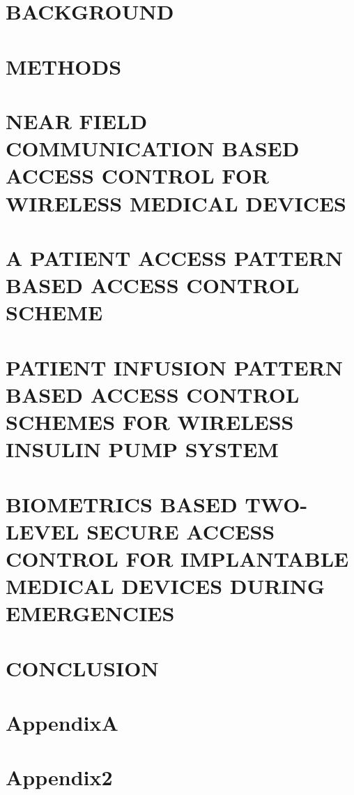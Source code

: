 \documentclass[reqno,12pt,oneside]{report} %
\begin{document}
\chapter{BACKGROUND}
 \label{chap:2}
 

\chapter{METHODS}
 \label{chap:3}
 

\chapter{NEAR FIELD COMMUNICATION BASED ACCESS CONTROL FOR WIRELESS MEDICAL DEVICES}
 \label{chap:4}
 

\chapter{A PATIENT ACCESS PATTERN BASED ACCESS CONTROL SCHEME}
 \label{chap:5}
 

\chapter{PATIENT INFUSION PATTERN BASED ACCESS CONTROL SCHEMES FOR WIRELESS INSULIN PUMP SYSTEM}
 \label{chap:6}
 

\chapter{BIOMETRICS BASED TWO-LEVEL SECURE ACCESS CONTROL FOR IMPLANTABLE MEDICAL DEVICES DURING EMERGENCIES}
 \label{chap:7}
 

\chapter{CONCLUSION}
 \label{chap:8}
 


\startbibliography
 \begin{singlespace} %
  
  
 \end{singlespace}

 \startappendices
 \chapter{AppendixA}
 \label{Appendix:A}
 
 
  \chapter{Appendix2}
 \label{Appendix:B}
 
\end{document}
